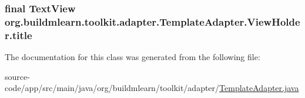 \subsubsection[{\texorpdfstring{title}{title}}]{\setlength{\rightskip}{0pt plus 5cm}final Text\+View org.\+buildmlearn.\+toolkit.\+adapter.\+Template\+Adapter.\+View\+Holder.\+title}\hypertarget{classorg_1_1buildmlearn_1_1toolkit_1_1adapter_1_1TemplateAdapter_1_1ViewHolder_a1c17241fb519b68d8e1c87286bd12cae}{}\label{classorg_1_1buildmlearn_1_1toolkit_1_1adapter_1_1TemplateAdapter_1_1ViewHolder_a1c17241fb519b68d8e1c87286bd12cae}


The documentation for this class was generated from the following file\+:\begin{DoxyCompactItemize}
\item 
source-\/code/app/src/main/java/org/buildmlearn/toolkit/adapter/\hyperlink{TemplateAdapter_8java}{Template\+Adapter.\+java}\end{DoxyCompactItemize}
